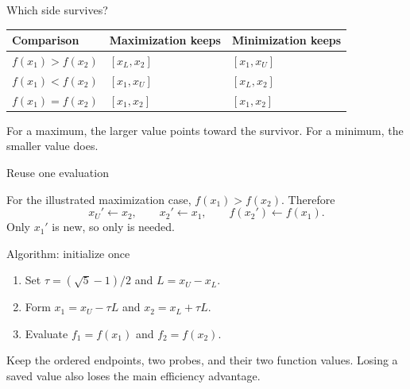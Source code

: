 \documentclass[aspectratio=169,11pt,t]{beamer}
\begin{document}
\begin{frame}{Which side survives?}
  \renewcommand{\arraystretch}{1.24}
  \centering
  \begin{tabular}{@{}lll@{}}
    \toprule
    Comparison & Maximization keeps & Minimization keeps \\
    \midrule
    \(f(x_1)>f(x_2)\) & \([x_L,x_2]\) & \([x_1,x_U]\) \\
    \(f(x_1)<f(x_2)\) & \([x_1,x_U]\) & \([x_L,x_2]\) \\
    \(f(x_1)=f(x_2)\) & \([x_1,x_2]\) & \([x_1,x_2]\) \\
    \bottomrule
  \end{tabular}

  \vspace{0.14cm}
  \begin{keyidea}
    For a maximum, the larger value points toward the survivor. For a minimum,
    the smaller value does.
  \end{keyidea}
\end{frame}

\begin{frame}{Reuse one evaluation}
  \centering
  

  \vspace{0.24cm}
  For the illustrated maximization case, \(f(x_1)>f(x_2)\). Therefore
  \[
    x_U'\gets x_2, \qquad x_2'\gets x_1,
    \qquad f(x_2')\gets f(x_1).
  \]
  Only \(x_1'\) is new, so only  is needed.
\end{frame}

\begin{frame}{Algorithm: initialize once}
  \begin{enumerate}
    \item Set \(\tau=(\sqrt5-1)/2\) and \(L=x_U-x_L\).
    \item Form \(x_1=x_U-\tau L\) and \(x_2=x_L+\tau L\).
    \item Evaluate \(f_1=f(x_1)\) and \(f_2=f(x_2)\).
  \end{enumerate}

  \vspace{0.18cm}
  \begin{keyidea}
    Keep the ordered endpoints, two probes, and their two function values.
    Losing a saved value also loses the main efficiency advantage.
  \end{keyidea}
\end{frame}
\end{document}
